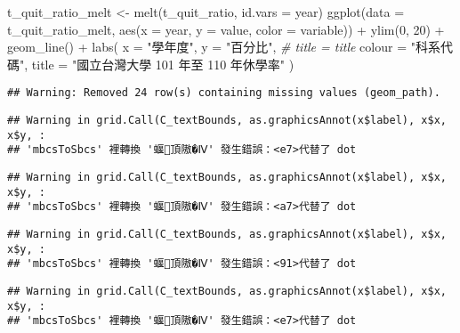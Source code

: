 \documentclass[
]{article}
\newenvironment{Shaded}{\begin{snugshade}}{\end{snugshade}}
\newcommand{\AttributeTok}[1]{\textcolor[rgb]{0.77,0.63,0.00}{#1}}
\newcommand{\CommentTok}[1]{\textcolor[rgb]{0.56,0.35,0.01}{\textit{#1}}}
\newcommand{\DecValTok}[1]{\textcolor[rgb]{0.00,0.00,0.81}{#1}}
\newcommand{\FunctionTok}[1]{\textcolor[rgb]{0.00,0.00,0.00}{#1}}
\newcommand{\NormalTok}[1]{#1}
\newcommand{\OtherTok}[1]{\textcolor[rgb]{0.56,0.35,0.01}{#1}}
\newcommand{\SpecialCharTok}[1]{\textcolor[rgb]{0.00,0.00,0.00}{#1}}
\newcommand{\StringTok}[1]{\textcolor[rgb]{0.31,0.60,0.02}{#1}}
\begin{document}
\begin{Shaded}
\begin{Highlighting}[]
\NormalTok{t\_quit\_ratio\_melt }\OtherTok{\textless{}{-}} \FunctionTok{melt}\NormalTok{(t\_quit\_ratio, }\AttributeTok{id.vars =} \StringTok{\textquotesingle{}year\textquotesingle{}}\NormalTok{)}
\FunctionTok{ggplot}\NormalTok{(}\AttributeTok{data =}\NormalTok{ t\_quit\_ratio\_melt, }\FunctionTok{aes}\NormalTok{(}\AttributeTok{x =}\NormalTok{ year, }\AttributeTok{y =}\NormalTok{ value, }\AttributeTok{color =}\NormalTok{ variable)) }\SpecialCharTok{+}
    \FunctionTok{ylim}\NormalTok{(}\DecValTok{0}\NormalTok{, }\DecValTok{20}\NormalTok{) }\SpecialCharTok{+} 
    \FunctionTok{geom\_line}\NormalTok{() }\SpecialCharTok{+} 
    \FunctionTok{labs}\NormalTok{(}
        \AttributeTok{x =} \StringTok{"學年度"}\NormalTok{,}
        \AttributeTok{y =} \StringTok{"百分比"}\NormalTok{,}
        \CommentTok{\# title = title}
        \AttributeTok{colour =} \StringTok{"科系代碼"}\NormalTok{,}
        \AttributeTok{title =} \StringTok{"國立台灣大學 101 年至 110 年休學率"}
\NormalTok{        )}
\end{Highlighting}
\end{Shaded}

\begin{verbatim}
## Warning: Removed 24 row(s) containing missing values (geom_path).
\end{verbatim}

\begin{verbatim}
## Warning in grid.Call(C_textBounds, as.graphicsAnnot(x$label), x$x, x$y, :
## 'mbcsToSbcs' 裡轉換 '蝘頂隞�Ⅳ' 發生錯誤：<e7>代替了 dot
\end{verbatim}

\begin{verbatim}
## Warning in grid.Call(C_textBounds, as.graphicsAnnot(x$label), x$x, x$y, :
## 'mbcsToSbcs' 裡轉換 '蝘頂隞�Ⅳ' 發生錯誤：<a7>代替了 dot
\end{verbatim}

\begin{verbatim}
## Warning in grid.Call(C_textBounds, as.graphicsAnnot(x$label), x$x, x$y, :
## 'mbcsToSbcs' 裡轉換 '蝘頂隞�Ⅳ' 發生錯誤：<91>代替了 dot
\end{verbatim}

\begin{verbatim}
## Warning in grid.Call(C_textBounds, as.graphicsAnnot(x$label), x$x, x$y, :
## 'mbcsToSbcs' 裡轉換 '蝘頂隞�Ⅳ' 發生錯誤：<e7>代替了 dot
\end{verbatim}
\end{document}
